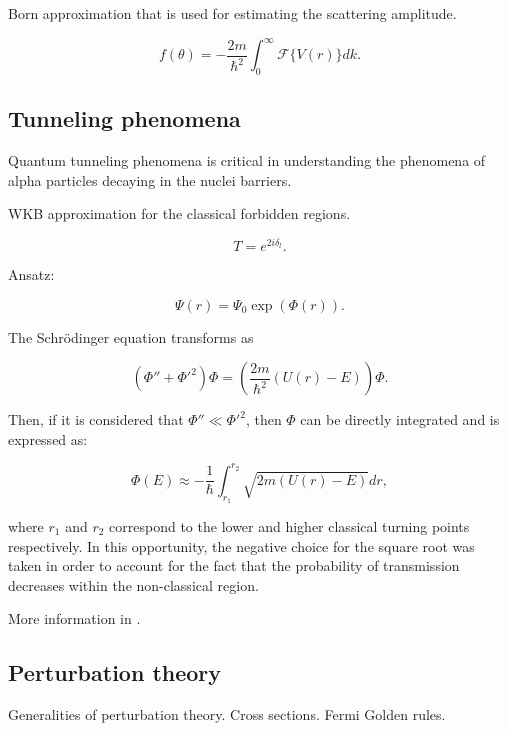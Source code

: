\documentclass[openany]{book}
\begin{document}
Born approximation that is used for estimating the scattering amplitude.

\begin{equation} \label{eq:bornApproximation_scatteringAmplitude}
	f(\theta) =   - \frac{2m}{\hbar^2} \int_{0}^{\infty} {\mathcal{F}\{V(r)\}dk}.
\end{equation}


\subsection{Tunneling phenomena} \label{sub:tunnelingPhenomena}

Quantum tunneling phenomena is critical in understanding the phenomena of alpha particles decaying in the nuclei barriers. 

WKB approximation for the classical forbidden regions.

\begin{equation} \label{eq:tunneling_transmissionProbability}
	T = e^{2i\delta_l}.
\end{equation}


Ansatz: 

\begin{equation} \label{eq:WKB_ansatz}
	\Psi(r) = \Psi_0\exp{(\Phi(r))}.
\end{equation}

The Schrödinger equation transforms as 

\begin{equation} \label{eq:WKB_schrodinger}
	\left(\Phi'' + \Phi'^{2} \right)\Phi = \left(\frac{2m}{\hbar^2} (U(r) - E)\right) \Phi.
\end{equation}

Then, if it is considered that $\Phi'' \ll \Phi'^{2}$, then $\Phi$ can be directly integrated and is expressed as:

\begin{equation} \label{eq:WKB_definition}
	\Phi(E) \approx -\frac{1}{\hbar}\int_{r_1}^{r_2} {\sqrt{2m(U(r)-E)}} dr,
\end{equation}

where $r_1$ and $r_2$ correspond to the lower and higher classical turning points respectively. In this opportunity, the negative choice for the square root was taken in order to account for the fact that the probability of transmission decreases within the non-classical region.

More information in \cite{newton_2002}.

\subsection{Perturbation theory}\label{sub:perturbationTheory}
Generalities of perturbation theory. Cross sections.  Fermi Golden rules.
\end{document}
